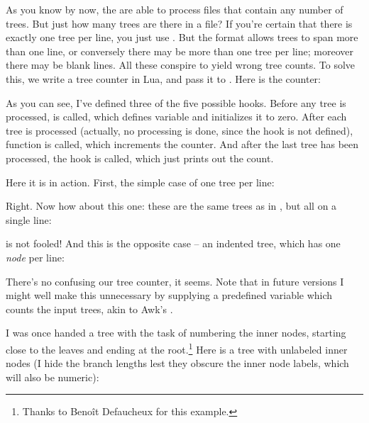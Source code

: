 
As you know by now, the \nutils{} are able to process files that contain any
number of trees. But just how many trees are there in a file? If you're certain
that there is exactly one tree per line, you just use . But the
\nw{} format allows trees to span more than one line, or conversely there may be
more than one tree per line; moreover there may be blank lines. All these
conspire to yield wrong tree counts. To solve this, we write a tree counter in
Lua, and pass it to \luaed. Here is the counter:


As you can see, I've defined three of the five possible hooks. Before any tree
is processed,  is called, which defines variable
 and initializes it to zero. After each tree is processed
(actually, no processing is done, since the  hook is not defined),
function  is called, which increments the counter. And after
the last tree has been processed, the  hook is called, which
just prints out the count.

Here it is in action. First, the simple case of one tree per line:



Right. Now how about this one: these are the same trees as in
, but all on a single line:



\luaed{} is not fooled! And this is the opposite case -- an indented tree, which has one {\em node} per line:



There's no confusing our tree counter, it seems. Note that in future versions I
might well make this unnecessary by supplying a predefined variable which counts
the input trees, akin to Awk's .


I was once handed a tree with the task of numbering the inner nodes, starting
close to the leaves and ending at the root.\footnote{Thanks to Beno\^{i}t
Defaucheux for this example.} Here is a tree with unlabeled inner nodes (I hide
the branch lengths lest they obscure the inner node labels, which will also be
numeric):

